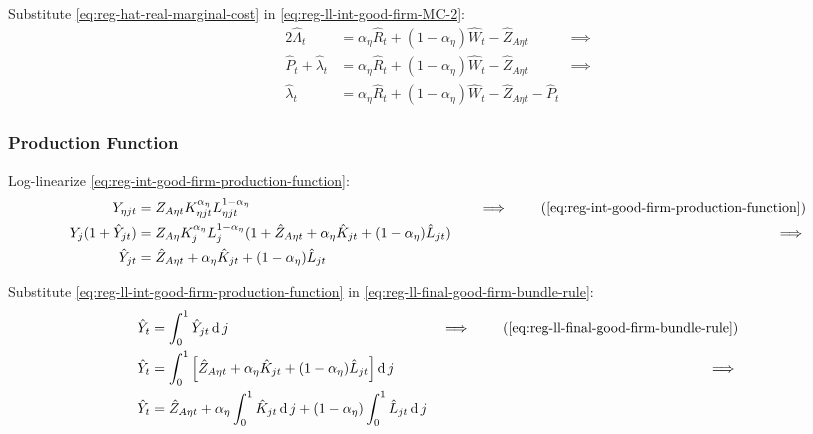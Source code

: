 \documentclass[
	thesis.tex
	]{subfiles}
\begin{document}
Substitute \ref{eq:reg-hat-real-marginal-cost} in \ref{eq:reg-ll-int-good-firm-MC-2}:
\begin{alignat}{2}
	\hat{\Lambda}_t &= {\alpha_\eta} \hat{R}_t + (1- {\alpha_\eta}) \hat{W}_t - \hat{Z}_{A\eta t} &\implies \nonumber \\
	\hat{P}_t + \hat{\lambda}_t &= {\alpha_\eta} \hat{R}_t + (1- {\alpha_\eta}) \hat{W}_t - \hat{Z}_{A\eta t} &\implies \nonumber \\
	\hat{\lambda}_t &= {\alpha_\eta} \hat{R}_t + (1- {\alpha_\eta}) \hat{W}_t - \hat{Z}_{A\eta t} - \hat{P}_t \label{eq:reg-ll-int-good-firm-MC-3}
\end{alignat}


\subsubsection{Production Function}

Log-linearize \ref{eq:reg-int-good-firm-production-function}:
\begin{alignat}{2}
	Y_{\eta jt} &= Z_{A\eta t} K_{\eta jt}^{\alpha_\eta} L_{\eta jt}^{1-{\alpha_\eta}} &\implies \tag{\ref{eq:reg-int-good-firm-production-function}} \\
	Y_{j} (1+ \hat{Y}_{jt}) &= Z_{A\eta} K_{j}^{\alpha_\eta} L_{j}^{1-{\alpha_\eta}} (1+ \hat{Z}_{A\eta t} + {\alpha_\eta} \hat{K}_{jt} + (1-{\alpha_\eta}) \hat{L}_{jt}) \quad &\implies \nonumber \\
	\hat{Y}_{jt} &= \hat{Z}_{A\eta t} + {\alpha_\eta} \hat{K}_{jt} + (1-{\alpha_\eta}) \hat{L}_{jt} \label{eq:reg-ll-int-good-firm-production-function}
\end{alignat}

Substitute \ref{eq:reg-ll-int-good-firm-production-function} in \ref{eq:reg-ll-final-good-firm-bundle-rule}:
\begin{alignat}{2}
	\hat{Y}_t &= \int_{0}^{1} \hat{Y}_{jt} \dif j &\implies \tag{\ref{eq:reg-ll-final-good-firm-bundle-rule}} \\
	\hat{Y}_t &= \int_{0}^{1} \left[ \hat{Z}_{A\eta t} + {\alpha_\eta} \hat{K}_{jt} + (1-{\alpha_\eta}) \hat{L}_{jt} \right] \dif j &\implies \nonumber \\
	\hat{Y}_t &= \hat{Z}_{A\eta t} + {\alpha_\eta} \int_{0}^{1} \hat{K}_{jt} \dif j + (1-{\alpha_\eta}) \int_{0}^{1} \hat{L}_{jt} \dif j \label{eq:reg-ll-final-good-firm-bundle-rule-2}
\end{alignat}
\end{document}
